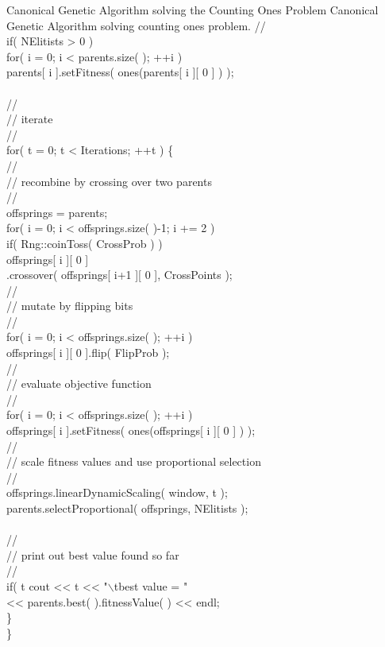 \begin{programlisting}{Canonical Genetic Algorithm solving the Counting Ones Problem}{
    Canonical Genetic Algorithm solving counting ones problem.}
    //\\
    if( NElitists > 0 )\\
        for( i = 0; i < parents.size( ); ++i )\\
            parents[ i ].setFitness( ones(parents[ i ][ 0 ] ) );\\
\\
    //\\
    // iterate\\
    //\\
    for( t = 0; t < Iterations; ++t ) \{\\
        //\\
        // recombine by crossing over two parents\\
        //\\
        offsprings = parents;\\
        for( i = 0; i < offsprings.size( )-1; i += 2 )\\
            if( Rng::coinToss( CrossProb ) )\\
                offsprings[ i ][ 0 ]\\
                    .crossover( offsprings[ i+1 ][ 0 ], CrossPoints );\\
        //\\
        // mutate by flipping bits\\
        //\\
        for( i = 0; i < offsprings.size( ); ++i )\\
            offsprings[ i ][ 0 ].flip( FlipProb );\\
        //\\
        // evaluate objective function\\
        //\\
        for( i = 0; i < offsprings.size( ); ++i )\\
            offsprings[ i ].setFitness( ones(offsprings[ i ][ 0 ] ) );\hspace{-10ex}\\
        //\\
        // scale fitness values and use proportional selection\\
        //\\
        offsprings.linearDynamicScaling( window, t );\\
        parents.selectProportional( offsprings, NElitists );\\
\\
        //\\
        // print out best value found so far\\
        //\\
        if( t %
            cout << t << "$\backslash$tbest value = "\\
                 << parents.best( ).fitnessValue( ) << endl;\\
    \}\\
\}\\
\end{programlisting}

